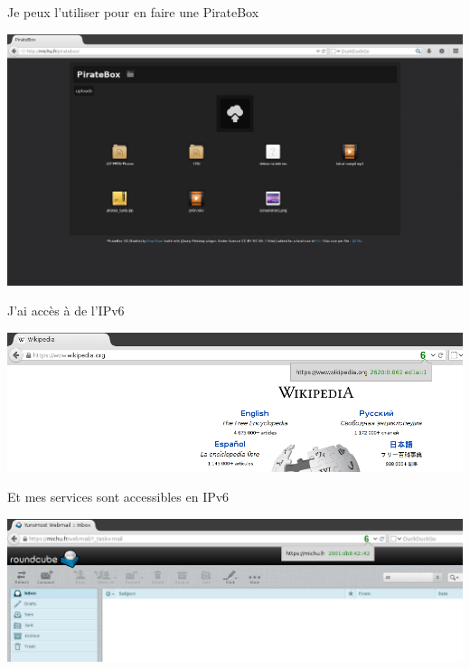 \documentclass[notes=hide]{beamer}
\begin{document}
\begin{frame}[t]{Je peux l'utiliser pour en faire une PirateBox}
\begin{center}
\vfill
\includegraphics[width=\textwidth]{img/28-capture-piratebox.png}
\vfill
\end{center}
\end{frame}


\begin{frame}[t]{J'ai accès à de l'IPv6}
\begin{center}
\vfill
\includegraphics[width=\textwidth]{img/08-capture-ipv6wikipedia.png}
\vfill
\end{center}
\end{frame}

\begin{frame}[t]{Et mes services sont accessibles en IPv6}
\begin{center}
\vfill
\includegraphics[width=\textwidth]{img/24-capture-ipv6roundcube.png}
\vfill
\end{center}
\end{frame}
\end{document}

